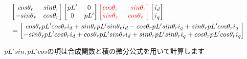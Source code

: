\begin{fleqn}[8pt]
{\begin{align*}
    &\begin{bmatrix}
        cos\theta_{r} & sin\theta_{r} \\
        -sin\theta_{r} & cos\theta_{r}
    \end{bmatrix}
    \begin{bmatrix}
        pL' & 0 \\
        0 & pL'
    \end{bmatrix}
    \textcolor{red}{
    \begin{bmatrix}
        cos\theta_{r} & -sin\theta_{r} \\
        sin\theta_{r} & cos\theta_{r}
    \end{bmatrix}}
    \begin{bmatrix}
        i_{d} \\
        i_{q}
    \end{bmatrix}
    \\
    &=
    \begin{bmatrix}
    cos\theta_{r}pL'cos\theta_{r}i_{d} + sin\theta_{r}pL'sin\theta_{r}i_{d} - cos\theta_{r}pL'sin\theta_{r}i_{q} + sin\theta_{r}pL'cos\theta_{r}i_{q} \\
    -sin\theta_{r}pL'cos\theta_{r}i_{d} + cos\theta_{r}pL'sin\theta_{r}i_{d} + sin\theta_{r}pL'sin\theta_{r}i_{q} + cos\theta_{r}pL'cos\theta_{r}i_{q}
    \end{bmatrix}
\end{align*}
}
\end{fleqn}
$pL'sin,pL'cos$の項は合成関数と積の微分公式を用いて計算します
